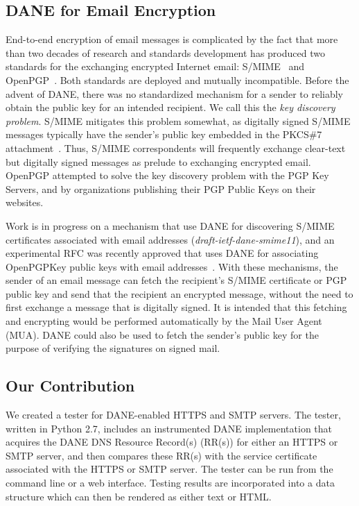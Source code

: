 \documentclass[preprint,3p,11pt]{elsarticle}
\begin{document}
\subsection{DANE for Email Encryption}

End-to-end encryption of email messages is complicated by the fact
that more than two decades of research and standards development
has produced two 
standards for the exchanging encrypted Internet email:
S/MIME~\cite{rfc5750} and OpenPGP~\cite{rfc4880}. Both standards are
deployed and mutually incompatible. Before the advent of
DANE, there was no standardized mechanism for a sender to reliably obtain the
public key for an intended recipient. We call this the \emph{key
  discovery problem}. S/MIME mitigates this problem somewhat,
as digitally signed S/MIME messages typically have the sender's public
key embedded in the PKCS\#7 attachment~\cite{rfc2315}. Thus, S/MIME
correspondents will frequently exchange clear-text but digitally
signed messages as prelude to exchanging encrypted email. OpenPGP
attempted to solve the key discovery problem with the PGP Key
Servers, and by organizations publishing their PGP Public Keys on
their websites. 

Work is in progress on a mechanism that use DANE for discovering S/MIME certificates
associated with email addresses (\emph{draft-ietf-dane-smime11}), and
an experimental RFC was recently approved that uses DANE for associating OpenPGPKey
public keys with email addresses~\cite{rfc7929}. With these mechanisms,
the sender of an email message can fetch the recipient's S/MIME certificate or
PGP public key and send that the recipient an encrypted message,
without the need to first exchange a message that is digitally
signed. It is intended that this fetching and encrypting would be
performed automatically by the Mail User Agent (MUA). DANE could also
be used to fetch the sender's public key for the purpose of verifying
the signatures on signed mail.

\subsection{Our Contribution}

We created a tester for DANE-enabled HTTPS and SMTP servers. The
tester, written in Python 2.7, includes an instrumented DANE
implementation that acquires the DANE DNS Resource Record(s) (RR(s)) for
either an HTTPS or SMTP server, and then compares these RR(s) with the service
certificate associated with the HTTPS or SMTP server. The tester can be run from
the command line or a web interface. Testing results are incorporated into
a data structure which can then be rendered as either text or HTML.
\end{document}
